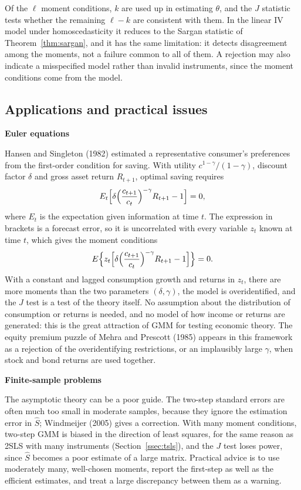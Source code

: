 \documentclass[11pt,a4paper]{article}
\numberwithin{equation}{section}
\theoremstyle{definition}
\newcommand{\subhead}[1]{%
  \par\medskip\noindent\textbf{#1}\par\nobreak\smallskip}
\begin{document}
Of the $\ell$ moment conditions, $k$ are used up in estimating $\theta$, and the $J$ statistic tests whether the remaining $\ell - k$ are consistent with them. In the linear IV
model under homoscedasticity it reduces to the Sargan statistic of Theorem~\ref{thm:sargan}, and it has the same limitation: it detects disagreement among
the moments, not a failure common to all of them. A rejection may also indicate a misspecified model rather than invalid instruments, since the moment
conditions come from the model.

\subsection{Applications and practical issues}
\label{ssec:gmmapp}

\subhead{Euler equations}
Hansen and Singleton (1982) estimated a representative consumer's preferences from the first-order condition for saving. With utility
$c^{1-\gamma}/(1 - \gamma)$, discount factor $\delta$ and gross asset return $R_{t+1}$, optimal saving requires
\[
E_t\Bigl[\delta\Bigl(\frac{c_{t+1}}{c_t}\Bigr)^{-\gamma}R_{t+1} - 1\Bigr] = 0,
\]
where $E_t$ is the expectation given information at time $t$. The expression in brackets is a forecast error, so it is uncorrelated with every variable
$z_t$ known at time $t$, which gives the moment conditions
\[
E\Bigl\{z_t\Bigl[\delta\Bigl(\frac{c_{t+1}}{c_t}\Bigr)^{-\gamma}R_{t+1} - 1\Bigr]\Bigr\} = 0 .
\]
With a constant and lagged consumption growth and returns in $z_t$, there are more moments than the two parameters $(\delta, \gamma)$, the model is overidentified,
and the $J$ test is a test of the theory itself. No assumption about the distribution of consumption or returns is needed, and no model of how
income or returns are generated: this is the great attraction of GMM for testing economic theory. The equity premium puzzle of Mehra and
Prescott (1985) appears in this framework as a rejection of the overidentifying restrictions, or an implausibly large $\gamma$, when stock and bond returns are
used together.

\subhead{Finite-sample problems}
The asymptotic theory can be a poor guide. The two-step standard errors are often much too small in moderate samples, because they ignore the
estimation error in $\hat S$; Windmeijer (2005) gives a correction. With many moment conditions, two-step GMM is biased in the direction of least squares,
for the same reason as 2SLS with many instruments (Section~\ref{ssec:tsls}), and the $J$ test loses power, since $\hat S$ becomes a poor estimate of a large
matrix. Practical advice is to use moderately many, well-chosen moments, report the first-step as well as the efficient estimates, and treat a large
discrepancy between them as a warning.
\end{document}
